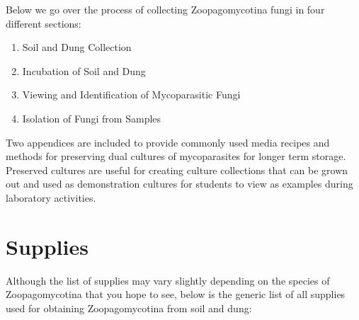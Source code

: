 \documentclass[]{book}
\providecommand{\tightlist}{%
  \setlength{\itemsep}{0pt}\setlength{\parskip}{0pt}}
\begin{document}
Below we go over the process of collecting Zoopagomycotina fungi in four different sections:

\begin{enumerate}
\def\labelenumi{\arabic{enumi}.}
\tightlist
\item
  Soil and Dung Collection
\item
  Incubation of Soil and Dung
\item
  Viewing and Identification of Mycoparasitic Fungi
\item
  Isolation of Fungi from Samples
\end{enumerate}

Two appendices are included to provide commonly used media recipes and methods for preserving dual cultures of mycoparasites for longer term storage. Preserved cultures are useful for creating culture collections that can be grown out and used as demonstration cultures for students to view as examples during laboratory activities.

\hypertarget{supplies}{%
\section{Supplies}\label{supplies}}

Although the list of supplies may vary slightly depending on the species of Zoopagomycotina that you hope to see, below is the generic list of all supplies used for obtaining Zoopagomycotina from soil and dung:
\end{document}
